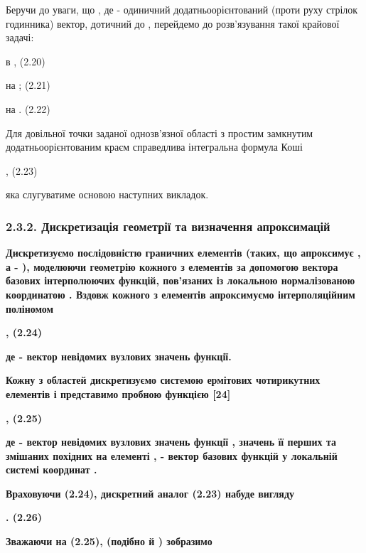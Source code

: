 Беручи до уваги, що , де - одиничний додатньоорієнтований (проти руху
стрілок годинника) вектор, дотичний до , перейдемо до розв'язування
такої крайової задачі:

в , (2.20)

на ; (2.21)

на . (2.22)

Для довільної точки заданої однозв'язної області з простим замкнутим
додатньоорієнтованим краєм справедлива інтегральна формула Коші

, (2.23)

яка слугуватиме основою наступних викладок.

\hypertarget{ux434ux438ux441ux43aux440ux435ux442ux438ux437ux430ux446ux456ux44f-ux433ux435ux43eux43cux435ux442ux440ux456ux457-ux442ux430-ux432ux438ux437ux43dux430ux447ux435ux43dux43dux44f-ux430ux43fux440ux43eux43aux441ux438ux43cux430ux446ux456ux439}{%
\subsubsection{2.3.2. Дискретизація геометрії та визначення
апроксимацій}\label{ux434ux438ux441ux43aux440ux435ux442ux438ux437ux430ux446ux456ux44f-ux433ux435ux43eux43cux435ux442ux440ux456ux457-ux442ux430-ux432ux438ux437ux43dux430ux447ux435ux43dux43dux44f-ux430ux43fux440ux43eux43aux441ux438ux43cux430ux446ux456ux439}}

\textbf{Дискретизуємо послідовністю граничних елементів (таких, що
апроксимує , а - ), моделюючи геометрію кожного з елементів за допомогою
вектора базових інтерполюючих функцій, пов'язаних із локальною
нормалізованою координатою . Вздовж кожного з елементів апроксимуємо
інтерполяційним поліномом}

\textbf{, (2.24)}

\textbf{де - вектор невідомих вузлових значень функції.}

\textbf{Кожну з областей дискретизуємо системою ермітових чотирикутних
елементів і представимо пробною функцією {[}24{]}}

\textbf{, (2.25)}

\textbf{де - вектор невідомих вузлових значень функції , значень її
перших та змішаних похідних на елементі , - вектор базових функцій у
локальній системі координат .}

\textbf{Враховуючи (2.24), дискретний аналог (2.23) набуде вигляду}

\textbf{. (2.26)}

\textbf{Зважаючи на (2.25), (подібно й ) зобразимо}

